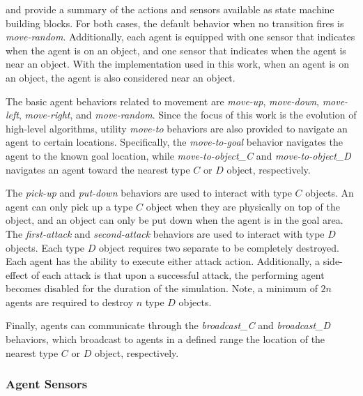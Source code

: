  and  provide a summary of the actions and sensors available as state machine building blocks.  For both cases, the default behavior when no transition fires is \emph{move-random}.  Additionally, each agent is equipped with one sensor that indicates when the agent is on an object, and one sensor that indicates when the agent is near an object.  With the implementation used in this work, when an agent is on an object, the agent is also considered near an object.

The basic agent behaviors related to movement are \emph{move-up}, \emph{move-down}, \emph{move-left}, \emph{move-right}, and \emph{move-random}.  Since the focus of this work is the evolution of high-level algorithms, utility \emph{move-to} behaviors are also provided to navigate an agent to certain locations.  Specifically, the \emph{move-to-goal} behavior navigates the agent to the known goal location, while \emph{move-to-object\_C} and \emph{move-to-object\_D} navigates an agent toward the nearest type $C$ or $D$ object, respectively.  

The \emph{pick-up} and \emph{put-down} behaviors are used to interact with type $C$ objects.  An agent can only pick up a type $C$ object when they are physically on top of the object, and an object can only be put down when the agent is in the goal area.  The \emph{first-attack} and \emph{second-attack} behaviors are used to interact with type $D$ objects.  Each type $D$ object requires two separate  to be completely destroyed.  Each agent has the ability to execute either attack action.  Additionally, a side-effect of each attack is that upon a successful attack, the performing agent becomes disabled for the duration of the simulation.  Note, a minimum of $2n$ agents are required to destroy $n$ type $D$ objects.

Finally, agents can communicate through the \emph{broadcast\_C} and \emph{broadcast\_D} behaviors, which broadcast to agents in a defined range the location of the nearest type $C$ or $D$ object, respectively.

\subsubsection{Agent Sensors}

